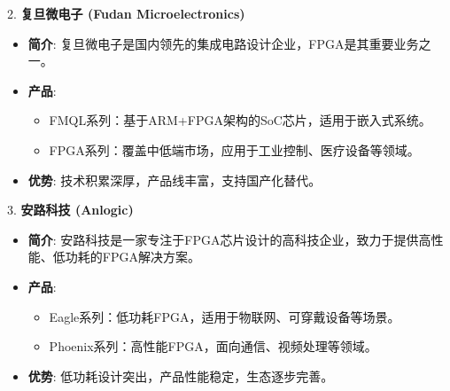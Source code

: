 \documentclass[
  ignorenonframetext,
  chinese,
]{beamer}
\providecommand{\tightlist}{%
  \setlength{\itemsep}{0pt}\setlength{\parskip}{0pt}}
\begin{document}
\begin{frame}
\begin{block}{2. \textbf{复旦微电子 (Fudan Microelectronics)}}
\label{ux590dux65e6ux5faeux7535ux5b50-fudan-microelectronics}
\begin{itemize}
\tightlist
\item
  \textbf{简介}:
  复旦微电子是国内领先的集成电路设计企业，FPGA是其重要业务之一。
\item
  \textbf{产品}:

  \begin{itemize}
  \tightlist
  \item
    FMQL系列：基于ARM+FPGA架构的SoC芯片，适用于嵌入式系统。\\
  \item
    FPGA系列：覆盖中低端市场，应用于工业控制、医疗设备等领域。\\
  \end{itemize}
\item
  \textbf{优势}: 技术积累深厚，产品线丰富，支持国产化替代。
\end{itemize}
\end{block}
\end{frame}

\begin{frame}
\begin{block}{3. \textbf{安路科技 (Anlogic)}}
\label{ux5b89ux8defux79d1ux6280-anlogic}
\begin{itemize}
\tightlist
\item
  \textbf{简介}:
  安路科技是一家专注于FPGA芯片设计的高科技企业，致力于提供高性能、低功耗的FPGA解决方案。
\item
  \textbf{产品}:

  \begin{itemize}
  \tightlist
  \item
    Eagle系列：低功耗FPGA，适用于物联网、可穿戴设备等场景。\\
  \item
    Phoenix系列：高性能FPGA，面向通信、视频处理等领域。\\
  \end{itemize}
\item
  \textbf{优势}: 低功耗设计突出，产品性能稳定，生态逐步完善。
\end{itemize}
\end{block}
\end{frame}
\end{document}

